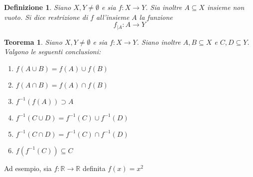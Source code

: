 \documentclass[11pt]{book}
\newtheorem*{theorem}{Teorema}
\newtheorem*{definition}{Definizione}
\begin{document}
\begin{definition}
    Siano $X,Y \neq \emptyset$ e sia $f:X\rightarrow Y$. Sia inoltre $A\subseteq X$ insieme non vuoto. Si dice restrizione 
    di $f$ all'insieme $A$ la funzione 
    \begin{equation*}
        f_{|A}:A\rightarrow Y
    \end{equation*}
\end{definition}
\begin{theorem}
    Siano $X,Y \neq \emptyset$ e sia $f:X\rightarrow Y$. Siano inoltre $A,B\subseteq X$ e $C,D\subseteq Y$. Valgono le 
    seguenti conclusioni:
    \begin{enumerate}
        \item $f(A\cup B)=f(A)\cup f(B)$
        \item $f(A\cap B)=f(A)\cap f(B)$
        \item $f^{-1}(f(A))\supset A$
        \item $f^{-1}(C\cup D)=f^{-1}(C)\cup f^{-1}(D)$
        \item $f^{-1}(C\cap D)=f^{-1}(C)\cap f^{-1}(D)$
        \item $f(f^{-1}(C))\subseteq C$
    \end{enumerate}
\end{theorem}
Ad esempio, sia $f:\mathbb{R}\rightarrow\mathbb{R}$ definita $f(x)=x^2$
\end{document}
